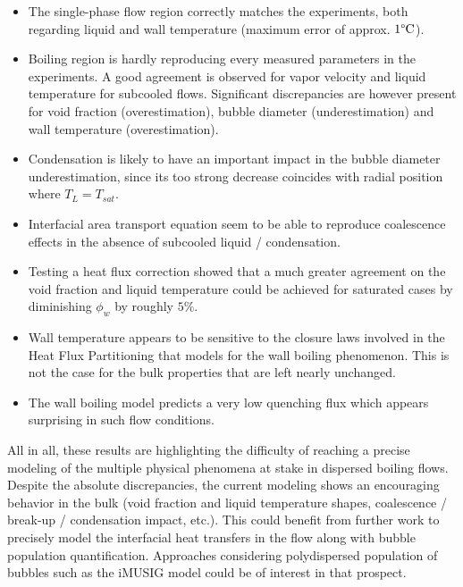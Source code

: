 \begin{itemize}
\item The single-phase flow region correctly matches the experiments, both regarding liquid and wall temperature (maximum error of approx. $1\degree\mathrm{C}$).

\item Boiling region is hardly reproducing every measured parameters in the experiments. A good agreement is observed for vapor velocity and liquid temperature for subcooled flows. Significant discrepancies are however present for void fraction (overestimation), bubble diameter (underestimation) and wall temperature (overestimation). 

\item Condensation is likely to have an important impact in the bubble diameter underestimation, since its too strong decrease coincides with radial position where $T_{L}=T_{sat}$. 

\item Interfacial area transport equation seem to be able to reproduce coalescence effects in the absence of subcooled liquid / condensation.


\item Testing a heat flux correction showed that a much greater agreement on the void fraction and liquid temperature could be achieved for saturated cases by diminishing $\phi_{w}$ by roughly $5\%$.

\item Wall temperature appears to be sensitive to the closure laws involved in the Heat Flux Partitioning that models for the wall boiling phenomenon. This is not the case for the bulk properties that are left nearly unchanged.

\item The wall boiling model predicts a very low quenching flux which appears surprising in such flow conditions. 


\end{itemize} 

All in all, these results are highlighting the difficulty of reaching a precise modeling of the multiple physical phenomena at stake in dispersed boiling flows. Despite the absolute discrepancies, the current modeling shows an encouraging behavior in the bulk (void fraction and liquid temperature shapes, coalescence / break-up / condensation impact, etc.). This could benefit from further work to precisely model the interfacial heat transfers in the flow along with bubble population quantification. Approaches considering polydispersed population of bubbles such as the iMUSIG model \cite{krepper_2008} could be of interest in that prospect.

